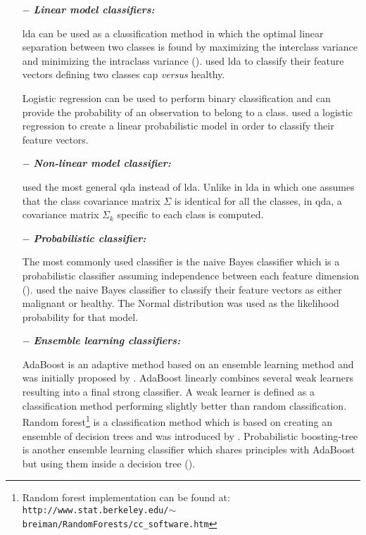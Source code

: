 \begin{enumerate}[leftmargin=*]
\item[$-$] \textbf{\textit{Linear model classifiers:}} 

  \Acf{lda} can be used as a classification method in which the optimal linear separation between two classes is found by maximizing the interclass variance and minimizing the intraclass variance (\cite{Friedman1989}). \cite{Antic2013,Chan2003,Litjens2014,Niaf2011,Niaf2012,Vos2012} used \ac{lda} to classify their feature vectors defining two classes \ac{cap} \textit{versus} healthy.

  Logistic regression can be used to perform binary classification and can provide the probability of an observation to belong to a class. \cite{Kelm2007,Puech2009} used a logistic regression to create a linear probabilistic model in order to classify their feature vectors.

\item[$-$] \textbf{\textit{Non-linear model classifier:}} 

  \cite{Viswanath2012} used the most general \acf{qda} instead of \ac{lda}. Unlike in \ac{lda} in which one assumes that the class covariance matrix $\Sigma$ is identical for all the classes, in \ac{qda}, a covariance matrix $\Sigma_k$ specific to each class is computed.

\item[$-$] \textbf{\textit{Probabilistic classifier:}}

  The most commonly used classifier is the naive Bayes classifier which is a probabilistic classifier assuming independence between each feature dimension (\cite{Rish2001}). \cite{Giannini2013,Mazzetti2011,Niaf2011,Niaf2012} used the naive Bayes classifier to classify their feature vectors as either malignant or healthy. The Normal distribution was used as the likelihood probability for that model.

\item[$-$] \textbf{\textit{Ensemble learning classifiers:}}

  AdaBoost is an adaptive method based on an ensemble learning method and was initially proposed by \cite{Freund1997}. AdaBoost linearly combines several weak learners resulting into a final strong classifier. A weak learner is defined as a classification method performing slightly better than random classification. Random forest\footnote{Random forest implementation can be found at: \texttt{http://www.stat.\allowbreak berkeley.edu/$\sim$breiman/RandomForests/cc\_software.htm}} is a classification method which is based on creating an ensemble of decision trees and was introduced by \cite{Breiman2001}. Probabilistic boosting-tree is another ensemble learning classifier which shares principles with AdaBoost but using them inside a decision tree (\cite{Tu2005}). 


\end{enumerate}

